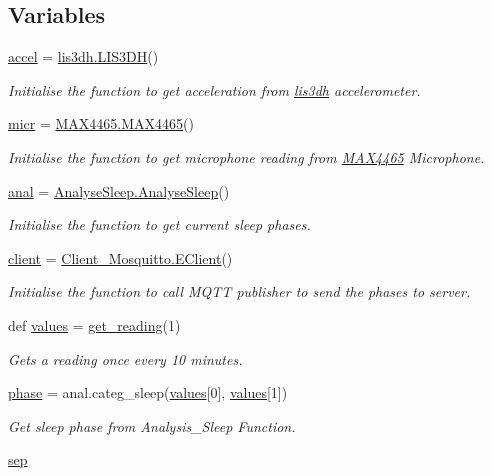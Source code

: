 \subsection*{Variables}
\begin{DoxyCompactItemize}
\item 
\mbox{\hyperlink{namespacemain_a8c8a40da45fbdc94330d48c7ed3ace09}{accel}} = \mbox{\hyperlink{classlis3dh_1_1_l_i_s3_d_h}{lis3dh.\+L\+I\+S3\+DH}}()
\begin{DoxyCompactList}\small\item\em Initialise the function to get acceleration from \mbox{\hyperlink{namespacelis3dh}{lis3dh}} accelerometer. \end{DoxyCompactList}\item 
\mbox{\hyperlink{namespacemain_a27768b36047205d2d3b08804bef89ec8}{micr}} = \mbox{\hyperlink{class_m_a_x4465_1_1_m_a_x4465}{M\+A\+X4465.\+M\+A\+X4465}}()
\begin{DoxyCompactList}\small\item\em Initialise the function to get microphone reading from \mbox{\hyperlink{namespace_m_a_x4465}{M\+A\+X4465}} Microphone. \end{DoxyCompactList}\item 
\mbox{\hyperlink{namespacemain_a0503d58472af5003363eb9294405572d}{anal}} = \mbox{\hyperlink{class_analyse_sleep_1_1_analyse_sleep}{Analyse\+Sleep.\+Analyse\+Sleep}}()
\begin{DoxyCompactList}\small\item\em Initialise the function to get current sleep phases. \end{DoxyCompactList}\item 
\mbox{\hyperlink{namespacemain_aad009058dac8198809f98fe83cc37d3a}{client}} = \mbox{\hyperlink{class_client___mosquitto_1_1_e_client}{Client\+\_\+\+Mosquitto.\+E\+Client}}()
\begin{DoxyCompactList}\small\item\em Initialise the function to call M\+Q\+TT publisher to send the phases to server. \end{DoxyCompactList}\item 
def \mbox{\hyperlink{namespacemain_a17b0e348aeb04d6902b433a3436c48d1}{values}} = \mbox{\hyperlink{namespacemain_a8c1b4e8df74031b6ee2d0809895a7c87}{get\+\_\+reading}}(1)
\begin{DoxyCompactList}\small\item\em Gets a reading once every 10 minutes. \end{DoxyCompactList}\item 
\mbox{\hyperlink{namespacemain_a820766bc10bffa4259a49bb6c4166b35}{phase}} = anal.\+categ\+\_\+sleep(\mbox{\hyperlink{namespacemain_a17b0e348aeb04d6902b433a3436c48d1}{values}}\mbox{[}0\mbox{]}, \mbox{\hyperlink{namespacemain_a17b0e348aeb04d6902b433a3436c48d1}{values}}\mbox{[}1\mbox{]})
\begin{DoxyCompactList}\small\item\em Get sleep phase from Analysis\+\_\+\+Sleep Function. \end{DoxyCompactList}\item 
\mbox{\hyperlink{namespacemain_ab3b0ae85668b1ae6099cf9bfd36077f0}{sep}}
\end{DoxyCompactItemize}


